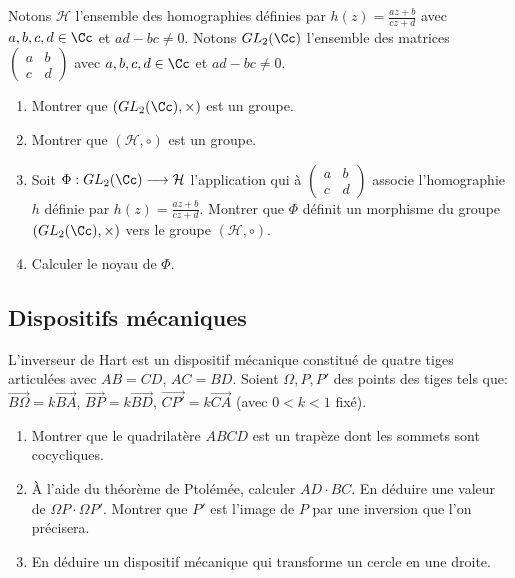 \documentclass[11pt,class=report,crop=false]{standalone}
\begin{document}
\begin{exercicecours}
Notons $\mathcal{H}$ l'ensemble des homographies définies par $h(z)= \frac{az+b}{cz+d}$ avec $a,b,c,d \in \Cc$ et $ad-bc \neq 0$.
Notons $GL_2(\Cc)$ l'ensemble des matrices $\left(\begin{smallmatrix} a & b \\ c & d \end{smallmatrix}\right)$ avec
$a,b,c,d \in \Cc$ et $ad-bc \neq 0$.
\begin{enumerate}
 \item Montrer que $(GL_2(\Cc),\times)$ est un groupe.
 \item Montrer que $(\mathcal{H},\circ)$ est un groupe.
 \item Soit $\Phi : GL_2(\Cc) \longrightarrow \mathcal{H}$ l'application qui à 
 $\left(\begin{smallmatrix} a & b \\ c & d \end{smallmatrix}\right)$ associe l'homographie $h$ définie par $h(z)= \frac{az+b}{cz+d}$.
 Montrer que $\Phi$ définit un morphisme du groupe $(GL_2(\Cc),\times)$ vers le groupe $(\mathcal{H},\circ)$.
 \item Calculer le noyau de $\Phi$.
\end{enumerate}
\end{exercicecours}


\subsection{Dispositifs mécaniques}


\begin{exercicecours}
\label{exo:inversion_hart}
L'inverseur de Hart est un dispositif mécanique constitué de quatre tiges articulées avec
$AB=CD$, $AC=BD$. Soient $\Omega, P, P'$ des points des tiges tels que:
$\overrightarrow{B\Omega} = k \overrightarrow{BA}$, $\overrightarrow{BP} = k \overrightarrow{BD}$,
 $\overrightarrow{CP'} = k \overrightarrow{CA}$ (avec $0< k < 1$ fixé).

\begin{enumerate}
 \item Montrer que le quadrilatère $ABCD$ est un trapèze dont les sommets sont cocycliques.
 
 \item \`A l'aide du théorème de Ptolémée, calculer $AD\cdot BC$. En déduire une valeur de $\Omega P\cdot \Omega P'$.
 Montrer que $P'$ est l'image de  $P$ par une inversion que l'on précisera.
 
 \item En déduire un dispositif mécanique qui transforme un cercle en une droite.
\end{enumerate} 

\end{exercicecours}




\finchapitre
\end{document}
